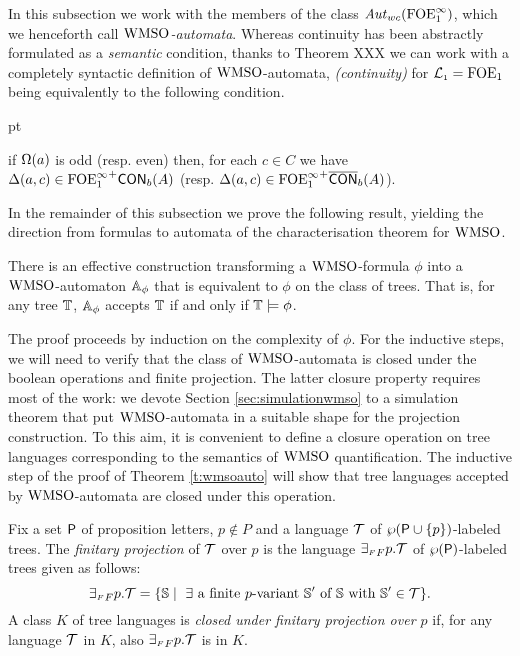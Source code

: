 

In this subsection we work with the members of the class $\mathit{Aut}_{wc}(\mathrm{FOE}^{\infty}_1)$, which we henceforth call \emph{$\mathrm{WMSO}$-automata}. Whereas continuity has been abstractly formulated as a \emph{semantic} condition, thanks to Theorem XXX  we can work with a completely syntactic definition of $\mathrm{WMSO}$-automata, \emph{(continuity)} for $\mathcal{L}_{\scriptscriptstyle 1} = \mathrm{FOE}_1$ being equivalently to the following condition. 
\begin{description}
	 pt
	\item[(continuity, syntactically)] if $\Omega(a)$ is odd (resp. even) then, for each $c\in C$ we have
	   $\Delta(a,c) \in {\ensuremath{\mathrm{FOE}^{\infty}_1}}^+\mathsf{CON}_{b}(A)$ (resp. $\Delta(a,c) \in {\ensuremath{\mathrm{FOE}^{\infty}_1}}^+\overline{\mathsf{CON}}_{b}(A)$).
\end{description} 

In the remainder of this subsection we prove the following result, yielding the direction from formulas to automata of the characterisation theorem for $\mathrm{WMSO}$.

\begin{theorem}
\label{t:wmsoauto}
There is an effective construction transforming a $\mathrm{WMSO}$-formula $\phi$
into a $\mathrm{WMSO}$-automaton $\mathbb{A}_{\phi}$ that is equivalent
to $\phi$ on the class of trees.
That is, for any tree $\mathbb{T}$, $\mathbb{A}_{\phi}$ accepts $\mathbb{T}$ if and only if $\mathbb{T} \models {\phi}$.
\end{theorem}

The proof proceeds by induction on the complexity of
$\phi$. For the inductive steps, we will need to verify that the class of
$\mathrm{WMSO}$-automata is closed under the boolean operations and finite projection.
The latter closure property requires most of the work: we devote Section \ref{sec:simulationwmso} to a simulation theorem that put $\mathrm{WMSO}$-automata in a suitable shape
for the projection construction.
%
To this aim, it is convenient to define a closure operation on tree languages corresponding
to the semantics of $\mathrm{WMSO}$ quantification. The inductive step of the proof of Theorem \ref{t:wmsoauto} will show that tree languages accepted by $\mathrm{WMSO}$-automata are closed under this operation.

\begin{definition}\label{def:tree_finproj}
Fix a set $\mathsf{P}$ of proposition letters, $p \not\in P$ and a language $\mathcal{T}$ of $\wp (\mathsf{P}\cup\{p\})$-labeled
trees.
The \emph{finitary projection} of $\mathcal{T}$ over $p$ is the language
${\exists_{{\scriptscriptstyle F}}}_F p.\mathcal{T}$ of $\wp (\mathsf{P})$-labeled trees
given as follows:
%
$$
{\finexists}_F p.\trees = \{\model \mid \text{ $\exists$ a finite $p$-variant } \model' \text{ of } \model \text{ with } \model' \in \trees\}.
$$
%
A class $K$ of tree languages is \emph{closed under finitary projection
over $p$} if, for any language $\mathcal{T}$ in $K$, also ${{\exists_{{\scriptscriptstyle F}}}_F p}.\mathcal{T}$ is in $K$.
\end{definition} 



